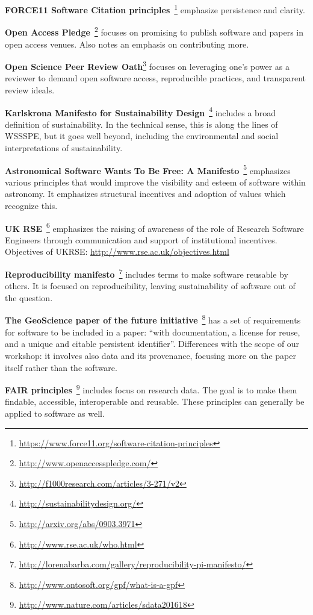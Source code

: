 \documentclass[a4paper,UKenglish]{dagman}
\newcommand{\manifesto}[1]{{\bf #1}\xspace}
\begin{document}
\begin{appendix}
\manifesto{FORCE11 Software Citation principles}~\cite{arfon_m._smith_software_2016}\footnote{\url{https://www.force11.org/software-citation-principles}}
emphasize persistence and clarity.

\manifesto{Open Access Pledge}~\cite{alex_holcombe_open_2011}\footnote{\url{http://www.openaccesspledge.com/}}
focuses on promising to publish software and papers in open access venues.
Also notes an emphasis on contributing more.

\manifesto{Open Science Peer Review Oath}\footnote{\url{http://f1000research.com/articles/3-271/v2}}
focuses on leveraging one's power as a reviewer to demand open software access, reproducible practices, and transparent review ideals.

\manifesto{Karlskrona Manifesto for Sustainability Design}~\cite{becker_karlskrona_2014}\footnote{\url{http://sustainabilitydesign.org/}}
includes a broad definition of sustainability. In the technical sense, this is along the lines of WSSSPE, but it goes well beyond, including the environmental and social interpretations of sustainability.

\manifesto{Astronomical Software Wants To Be Free: A Manifesto}~\cite{weiner_astronomical_2009}\footnote{\url{http://arxiv.org/abs/0903.3971}}
emphasizes various principles that would improve the visibility and esteem of software within astronomy. It emphasizes structural incentives and adoption of values which recognize this.

\manifesto{UK RSE}~\cite{rse_conference_2016_what_2016}\footnote{\url{http://www.rse.ac.uk/who.html}}
emphasizes the raising of awareness of the role of Research Software Engineers through communication and support of institutional incentives.
Objectives of UKRSE: \url{http://www.rse.ac.uk/objectives.html}

\manifesto{Reproducibility manifesto}~\cite{barba_reproducibility_2012}\footnote{\url{http://lorenabarba.com/gallery/reproducibility-pi-manifesto/}}
includes terms to make software reusable by others. It is focused on reproducibility, leaving sustainability of software out of the question.

\manifesto{The GeoScience paper of the future initiative}~\cite{onto_soft_what_2016}\footnote{\url{http://www.ontosoft.org/gpf/what-is-a-gpf}}
has a set of requirements for software to be included in a paper: ``with documentation, a license for reuse, and a unique and citable persistent identifier''. Differences with the scope of our workshop: it involves also data and its provenance, focusing more on the paper itself rather than the software.

\manifesto{FAIR principles}~\cite{wilkinson_fair_2016}\footnote{\url{http://www.nature.com/articles/sdata201618}}
includes focus on research data. The goal is to make them findable, accessible, interoperable and reusable. These principles can generally be applied to software as well.


% 



\end{appendix}
\end{document}
